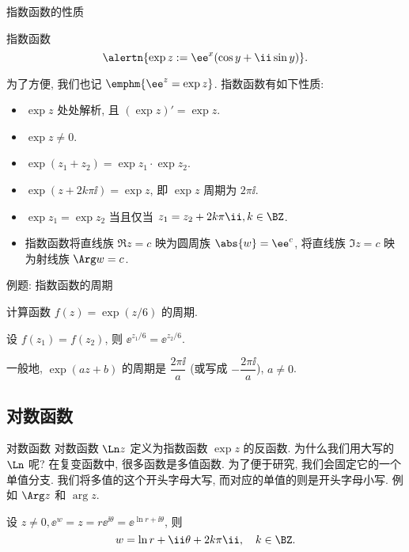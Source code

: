 \begin{frame}{指数函数的性质}
	\onslide<+->
	\begin{definition}
		指数函数
		\[
			\alertn{\exp z:=\ee^x(\cos y+\ii\sin y)}.
		\]
	\end{definition}
	\onslide<+->
	为了方便, 我们也记 $\emphm{\ee^z=\exp z}$.
	\onslide<+->
	指数函数有如下性质:
	\begin{itemize}\bf
		\item $\exp z$ 处处解析, 且 $(\exp z)'=\exp z$.
		\item $\exp z\neq 0$.
		\item $\exp(z_1+z_2)=\exp z_1\cdot \exp z_2$.
		\item $\exp(z+2k\pi\ii)=\exp z$, 即 $\exp z$ 周期为 $2\pi\ii$.
		\item $\exp z_1=\exp z_2$ 当且仅当 $z_1=z_2+2k\pi\ii,k\in\BZ$.
		\item 指数函数将直线族 $\Re z=c$ 映为圆周族 $\abs{w}=\ee^c$, 将直线族 $\Im z=c$ 映为射线族 $\Arg w=c$.
	\end{itemize}
\end{frame}


\begin{frame}{例题: 指数函数的周期}
	\onslide<+->
	\begin{example}[nearnext]
		计算函数 $f(z)=\exp(z/6)$ 的周期.
	\end{example}
	\onslide<+->
	\begin{solution}[nearprev]
		设 $f(z_1)=f(z_2)$, 则 $\ee^{z_1/6}=\ee^{z_2/6}$.
		\onslide<+->{%
			所以 $f(z)$ 的周期是 $12\pi\ii$.
		}
	\end{solution}

	\onslide<+->
	一般地, $\exp(az+b)$ 的周期是 $\dfrac{2\pi\ii}a$ (或写成 $-\dfrac{2\pi\ii}a$), $a\neq 0$.
\end{frame}


\subsection{对数函数}

\begin{frame}{对数函数}
	\onslide<+->
	对数函数 $\Ln z$ 定义为指数函数 $\exp z$ 的反函数.
	\onslide<+->
	为什么我们用大写的 $\Ln$ 呢? 
	\onslide<+->
	在复变函数中, 很多函数是多值函数.
	\onslide<+->
	为了便于研究, 我们会固定它的一个单值分支.
	\onslide<+->
	我们将多值的这个开头字母大写, 而对应的单值的则是开头字母小写.
	\onslide<+->
	例如 $\Arg z$ 和 $\arg z$.

	\onslide<+->
	设 $z\neq0,\ee^w=z=r\ee^{\ii\theta}=\ee^{\ln r+\ii\theta}$,
	\onslide<+->
	则
	\[w=\ln r+\ii\theta+2k\pi\ii,\quad k\in\BZ.
	\]
\end{frame}


